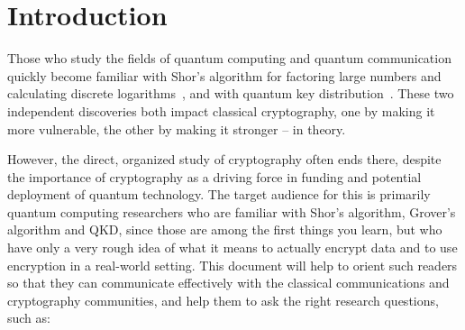 \section{Introduction}




Those who study the fields of quantum computing and quantum
communication quickly become familiar with Shor's algorithm for
factoring large numbers and calculating discrete
logarithms~\cite{shor:siam-factor}, and with quantum key
distribution~\cite{bennett:bb84,PhysRevLett.68.557,ekert1991qcb,PhysRevLett.108.130503,xu2015measurement,Vazirani:2019:FDI:3321370.3310974,RevModPhys.81.1301,PhysRevLett.85.441}.
These two independent discoveries both impact classical cryptography,
one by making it more vulnerable, the other by making it stronger --
in theory.

However, the direct, organized study of cryptography often ends there,
despite the importance of cryptography as a driving force in funding
and potential deployment of quantum technology.  The target audience
for this is primarily quantum computing researchers who are familiar
with Shor's algorithm, Grover's algorithm and QKD, since those are
among the first things you learn, but who have only a very rough idea
of what it means to actually encrypt data and to use encryption in a
real-world setting.  This document will help to orient such readers so
that they can communicate effectively with the classical
communications and cryptography communities, and help them to ask the
right research questions, such as:

